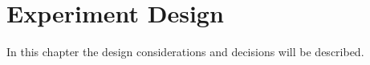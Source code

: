 
\chapter{Experiment Design}
In this chapter the design considerations and decisions will be described.






